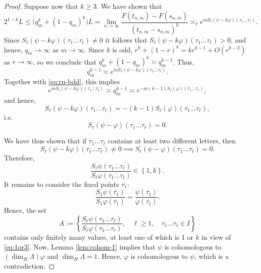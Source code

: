 \documentclass[11pt]{amsart}
\newcommand{\1}{1}
\begin{document}
\begin{proof}
Suppose now that $k\geq 3$. We have shown that
\[
2^{1-k}L\le \big(q_{m}^k+(1-q_{m})^k\big)L= \lim_{n\to\infty}\frac{F(t_{n,m})-F(s_{n,m})}{(t_{n,m}-s_{n,m})^k} \asymp_{\ell} e^{mS_{\ell}\left(\psi-k\varphi\right)(\overline{\tau_{1}\dots \tau_{\ell}})}.
\]
Since $S_{\ell}(\psi-k\varphi)\left(\overline{\tau_{1}\dots \tau_{\ell}}\right)\neq0$
it follows that $S_{\ell}(\psi-k\varphi)\left(\overline{\tau_{1}\dots \tau_{\ell}}\right)>0$, and hence, $q_{m}\rightarrow\infty$ as $m\rightarrow\infty$.
Since $k$ is odd, $r^k+(1-r)^k=kr^{k-1}+O(r^{k-2})$ as $r\to\infty$, so we conclude that $q_m^k+(1-q_m)^k\asymp q_m^{k-1}$. Thus,
\[
q_{m}^{k-1}\asymp e^{mS_{\ell}\left(\psi-k\varphi\right)(\overline{\tau_{1}\dots \tau_{\ell}})}.
\]
Together with \eqref{eq:rn-bdd}, this implies
\[
e^{mS_{\ell}\left(\psi-k\varphi\right)(\overline{\tau_{1}\dots \tau_{\ell}})} \asymp q_m^{k-1} \asymp e^{-m(k-1)S_{\ell}\left(\varphi\right)(\overline{\tau_{1}\dots \tau_{\ell}})},
\]
and hence, 
\[
S_{\ell}\left(\psi-k\varphi\right)(\overline{\tau_{1}\dots \tau_{\ell}})=-(k-1)S_{\ell}\left(\varphi\right)(\overline{\tau_{1}\dots \tau_{\ell}}),
\]
i.e. 
\[
S_{\ell}\left(\psi-\varphi\right)(\overline{\tau_{1}\dots \tau_{\ell}})=0.
\]

We have thus shown that if $\tau_{1}\dots \tau_{\ell}$ contains at least two different letters, then 
\[
S_{\ell}\left(\psi-k\varphi\right)(\overline{\tau_{1}\dots \tau_{\ell}})\neq0\implies S_{\ell}\left(\psi-\varphi\right)(\overline{\tau_{1}\dots \tau_{\ell}})=0.
\]
Therefore, 
\begin{equation}
\label{eq:1or3}
\frac{S_{\ell}\psi\left(\overline{\tau_{1}\dots \tau_{\ell}}\right)}{S_{\ell}\varphi\left(\overline{\tau_{1}\dots \tau_{\ell}}\right)}\in\left\{ 1,k\right\} .
\end{equation}
It remains to consider the fixed points $\overline{\tau_1}$:
\[
\frac{S_{1}\psi\left(\overline{\tau_1}\right)}{S_{1}\varphi\left(\overline{\tau_1}\right)}=\frac{\psi\left(\overline{\tau_1}\right)}{\varphi\left(\overline{\tau_1}\right)}.
\]
Hence, the set
\[
A:=\left\{\frac{S_{\ell}\psi\left(\overline{\tau_{1}\dots \tau_{\ell}}\right)}{S_{\ell}\varphi\left(\overline{\tau_{1}\dots \tau_{\ell}}\right)},\quad \ell \ge 1,\quad \tau_1\dots \tau_\ell \in I \right\}
\]
contains only finitely many values, at least one of which is 1 or $k$ in view of \eqref{eq:1or3}. Now, Lemma \ref{lem:cohom-1} implies
that $\psi$ is cohomologous to $(\dim_{H}\Lambda)\varphi$ and  $\dim_{H}\Lambda=1$.
Hence, $\varphi$ is cohomologous to $\psi$, which is a contradiction. 
\end{proof}
\end{document}
